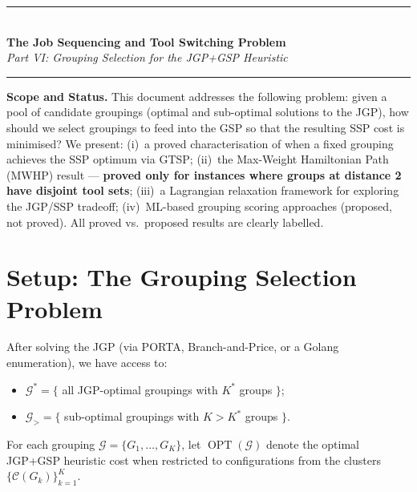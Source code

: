 \documentclass[11pt,a4paper]{article}
\theoremstyle{plain}
\theoremstyle{definition}
\DeclareMathOperator{\OPT}{OPT}
\newcommand{\Kstar}{K^*}
\newcommand{\calG}{\mathcal{G}}
\begin{document}

\begin{center}
  {\color{navyblue}\rule{\textwidth}{2pt}}\\[0.4cm]
  {\LARGE\bfseries\color{navyblue}The Job Sequencing and Tool Switching Problem}\\[0.3cm]
  {\large\itshape\color{midblue}Part VI: Grouping Selection for the JGP+GSP Heuristic}\\[0.2cm]
  {\color{navyblue}\rule{\textwidth}{2pt}}
\end{center}

\begin{mdframed}[backgroundcolor=lightblue,linecolor=navyblue,linewidth=1pt,
  innerleftmargin=14pt,innerrightmargin=14pt,innertopmargin=8pt,innerbottommargin=8pt]
\small\textbf{Scope and Status.}
This document addresses the following problem: given a pool of candidate groupings
(optimal and sub-optimal solutions to the JGP), how should we select groupings to
feed into the GSP so that the resulting SSP cost is minimised?
We present:
(i)~a proved characterisation of when a fixed grouping achieves the SSP optimum
via GTSP;
(ii)~the Max-Weight Hamiltonian Path (MWHP) result — \textbf{proved only for
instances where groups at distance 2 have disjoint tool sets};
(iii)~a Lagrangian relaxation framework for exploring the JGP/SSP tradeoff;
(iv)~ML-based grouping scoring approaches (proposed, not proved).
All proved vs.\ proposed results are clearly labelled.
\end{mdframed}

\vspace{0.5cm}
\tableofcontents
\newpage

\section{Setup: The Grouping Selection Problem}
\label{sec:setup}

After solving the JGP (via PORTA, Branch-and-Price, or a Golang enumeration),
we have access to:
\begin{itemize}
\item $\mathcal{G}^* = \{$ all JGP-optimal groupings with $\Kstar$ groups $\}$;
\item $\mathcal{G}_{>} = \{$ sub-optimal groupings with $K > \Kstar$ groups $\}$.
\end{itemize}
For each grouping $\calG = \{G_1,\ldots,G_K\}$, let $\OPT(\calG)$ denote the
optimal JGP+GSP heuristic cost when restricted to configurations from the
clusters $\{\mathcal{C}(G_k)\}_{k=1}^K$.
\end{document}
